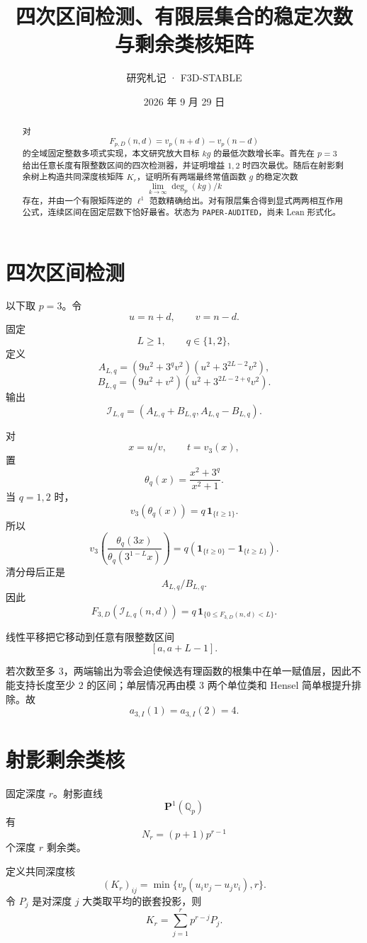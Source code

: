 \documentclass[11pt,a4paper]{ctexart}
\title{\bfseries 四次区间检测、有限层集合的稳定次数\\与剩余类核矩阵}
\author{研究札记 · F3D-STABLE}
\date{2026 年 9 月 29 日}
\begin{document}
\maketitle

\begin{abstract}
对
\[
F_{p,D}(n,d)=v_p(n+d)-v_p(n-d)
\]
的全域固定整数多项式实现，本文研究放大目标 \(kg\) 的最低次数增长率。首先在 \(p=3\) 给出任意长度有限整数区间的四次检测器，并证明增益 \(1,2\) 时四次最优。随后在射影剩余树上构造共同深度核矩阵 \(K_r\)，证明所有两端最终常值函数 \(g\) 的稳定次数
\[
\lim_{k\to\infty}\deg_p(kg)/k
\]
存在，并由一个有限矩阵逆的 \(\ell^1\) 范数精确给出。对有限层集合得到显式两两相互作用公式，连续区间在固定层数下恰好最省。状态为 \texttt{PAPER-AUDITED}，尚未 Lean 形式化。
\end{abstract}

\section{四次区间检测}
以下取 \(p=3\)。令
\[
u=n+d,\qquad v=n-d.
\]
固定
\[
L\ge1,\qquad q\in\{1,2\},
\]
定义
\[
A_{L,q}
=
(9u^2+3^qv^2)
(u^2+3^{2L-2}v^2),
\]
\[
B_{L,q}
=
(9u^2+v^2)
(u^2+3^{2L-2+q}v^2).
\]
输出
\[
\mathcal I_{L,q}
=
(A_{L,q}+B_{L,q},A_{L,q}-B_{L,q}).
\]

对
\[
x=u/v,\qquad t=v_3(x),
\]
置
\[
\theta_q(x)=\frac{x^2+3^q}{x^2+1}.
\]
当 \(q=1,2\) 时，
\[
v_3(\theta_q(x))
=
q\,\mathbf1_{\{t\ge1\}}.
\]
所以
\[
v_3\!\left(
\frac{\theta_q(3x)}
{\theta_q(3^{1-L}x)}
\right)
=
q(\mathbf1_{\{t\ge0\}}-\mathbf1_{\{t\ge L\}}).
\]
清分母后正是
\[
A_{L,q}/B_{L,q}.
\]
因此
\[
\boxed{
F_{3,D}(\mathcal I_{L,q}(n,d))
=
q\,\mathbf1_{\{0\le F_{3,D}(n,d)<L\}}.
}
\]

线性平移把它移动到任意有限整数区间
\[
[a,a+L-1].
\]

若次数至多 \(3\)，两端输出为零会迫使候选有理函数的根集中在单一赋值层，因此不能支持长度至少 \(2\) 的区间；单层情况再由模 \(3\) 两个单位类和 Hensel 简单根提升排除。故
\[
\boxed{
a_{3,I}(1)=a_{3,I}(2)=4.
}
\]

\section{射影剩余类核}
固定深度 \(r\)。射影直线
\[
\mathbf P^1(\mathbb Q_p)
\]
有
\[
N_r=(p+1)p^{r-1}
\]
个深度 \(r\) 剩余类。

定义共同深度核
\[
(K_r)_{ij}
=
\min\{v_p(u_iv_j-u_jv_i),r\}.
\]
令 \(P_j\) 是对深度 \(j\) 大类取平均的嵌套投影，则
\[
K_r
=
\sum_{j=1}^r
p^{r-j}P_j.
\]
\end{document}
